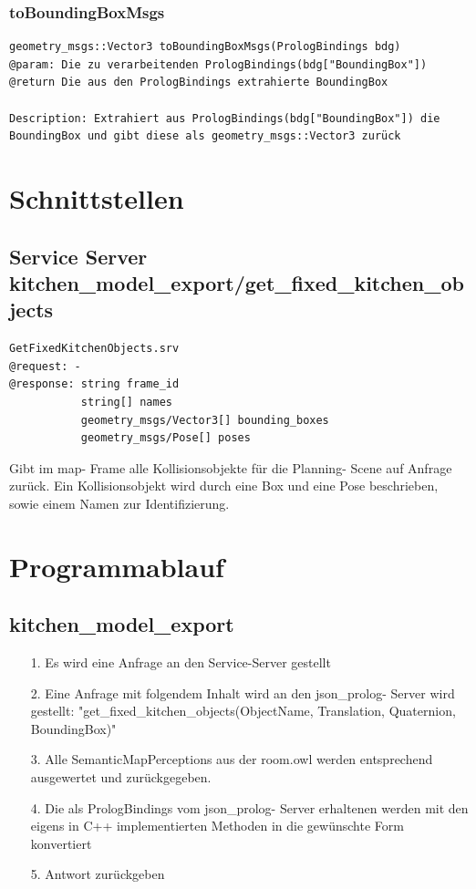 \documentclass{suturo}
\begin{document}
\subsubsection{toBoundingBoxMsgs}
\begin{verbatim}
geometry_msgs::Vector3 toBoundingBoxMsgs(PrologBindings bdg)
@param: Die zu verarbeitenden PrologBindings(bdg["BoundingBox"])
@return Die aus den PrologBindings extrahierte BoundingBox

Description: Extrahiert aus PrologBindings(bdg["BoundingBox"]) die BoundingBox und gibt diese als geometry_msgs::Vector3 zurück
\end{verbatim}\label{func:createpointnormals}
\section*{Schnittstellen}

\subsection*{Service Server kitchen\_model\_export/get\_fixed\_kitchen\_objects}
\begin{verbatim}
GetFixedKitchenObjects.srv
@request: -
@response: string frame_id
           string[] names
           geometry_msgs/Vector3[] bounding_boxes
           geometry_msgs/Pose[] poses
\end{verbatim}
Gibt im map- Frame alle Kollisionsobjekte für die Planning- Scene auf Anfrage zurück. Ein Kollisionsobjekt wird durch eine Box und eine Pose beschrieben, sowie einem Namen zur Identifizierung.

\section{Programmablauf}
\subsection{kitchen\_model\_export}
\begin{itemize}
\item[1.]Es wird eine Anfrage an den Service-Server gestellt
\item[2.]Eine Anfrage mit folgendem Inhalt wird an den json\_prolog- Server wird gestellt: "get\_fixed\_kitchen\_objects(ObjectName, Translation, Quaternion, BoundingBox)" 
\item[3.]Alle SemanticMapPerceptions aus der room.owl werden entsprechend ausgewertet und zurückgegeben.
\item[4.] Die als PrologBindings vom json\_prolog- Server erhaltenen werden mit den eigens in C++ implementierten Methoden in die gewünschte Form konvertiert
\item[5.] Antwort zurückgeben
\end{itemize}
\end{document}
